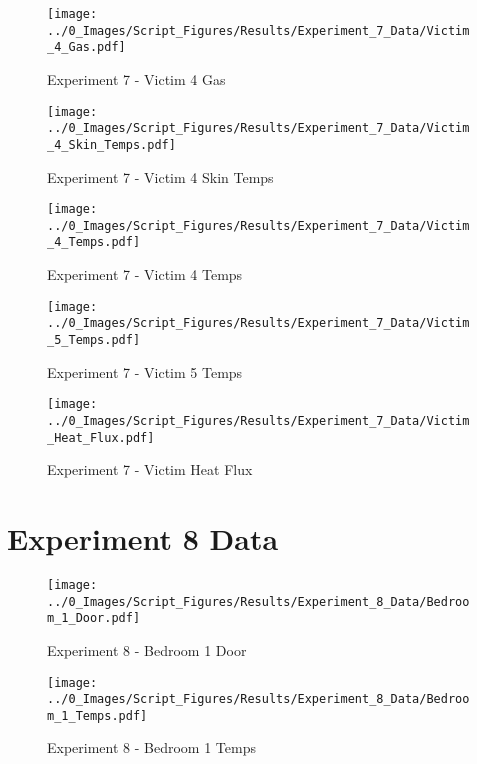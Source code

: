 	\clearpage

	\begin{figure}[H]
		\centering
		\texttt{[image: ../0\_Images/Script\_Figures/Results/Experiment\_7\_Data/Victim\_4\_Gas.pdf]}
		\caption[]{Experiment 7 - Victim 4 Gas}
	\end{figure}
 

	\begin{figure}[H]
		\centering
		\texttt{[image: ../0\_Images/Script\_Figures/Results/Experiment\_7\_Data/Victim\_4\_Skin\_Temps.pdf]}
		\caption[]{Experiment 7 - Victim 4 Skin Temps}
	\end{figure}
 
	\clearpage

	\begin{figure}[H]
		\centering
		\texttt{[image: ../0\_Images/Script\_Figures/Results/Experiment\_7\_Data/Victim\_4\_Temps.pdf]}
		\caption[]{Experiment 7 - Victim 4 Temps}
	\end{figure}
 

	\begin{figure}[H]
		\centering
		\texttt{[image: ../0\_Images/Script\_Figures/Results/Experiment\_7\_Data/Victim\_5\_Temps.pdf]}
		\caption[]{Experiment 7 - Victim 5 Temps}
	\end{figure}
 
	\clearpage

	\begin{figure}[H]
		\centering
		\texttt{[image: ../0\_Images/Script\_Figures/Results/Experiment\_7\_Data/Victim\_Heat\_Flux.pdf]}
		\caption[]{Experiment 7 - Victim Heat Flux}
	\end{figure}
 

\clearpage		\large
\section{Experiment 8 Data} \label{App:Exp8Results} 

	\begin{figure}[H]
		\centering
		\texttt{[image: ../0\_Images/Script\_Figures/Results/Experiment\_8\_Data/Bedroom\_1\_Door.pdf]}
		\caption[]{Experiment 8 - Bedroom 1 Door}
	\end{figure}
 

	\begin{figure}[H]
		\centering
		\texttt{[image: ../0\_Images/Script\_Figures/Results/Experiment\_8\_Data/Bedroom\_1\_Temps.pdf]}
		\caption[]{Experiment 8 - Bedroom 1 Temps}
	\end{figure}
 

